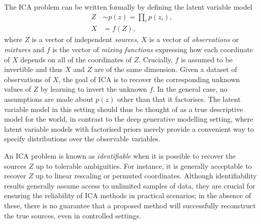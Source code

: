 The ICA problem can be written formally by defining the 
latent variable model
%
\begin{align}
Z &\sim p(z) = \prod_i p(z_i), \label{eqn:ica-basic-1} \\
X &= f(Z) \label{eqn:ica-basic-2},
\end{align}
%
where $Z$ is a vector of independent \emph{sources}, $X$ is a vector of \emph{observations} or \emph{mixtures} and $f$ is the vector of \emph{mixing functions} expressing how each coordinate of $X$ depends on all of the coordinates of $Z$. 
Crucially, $f$ is assumed to be invertible and thus $X$ and $Z$ are of the same dimension.
Given a dataset of observations of $X$, the goal of ICA is to recover the corresponding unknown values of $Z$ by learning to invert the unknown $f$.
In the general case, no assumptions are made about $p(z)$ other than that it factorises.
The latent variable model in this setting should thus be thought of as a true descriptive model for the world, 
in contrast to the deep generative modelling setting, where latent variable models with factorised priors merely provide a convenient way to specify distributions over the observable variables. 



An ICA problem is known as \emph{identifiable} when it is possible to recover the sources $Z$ up to tolerable ambiguities. 
For instance, it is generally acceptable to recover $Z$ up to linear rescaling or permuted coordinates.
Although identifiability results generally assume access to unlimited samples of data, they are crucial for ensuring the reliability of ICA methods in practical scenarios; in the absence of these, there is no guarantee that a proposed method will successfully reconstruct the true sources, even in controlled settings.

